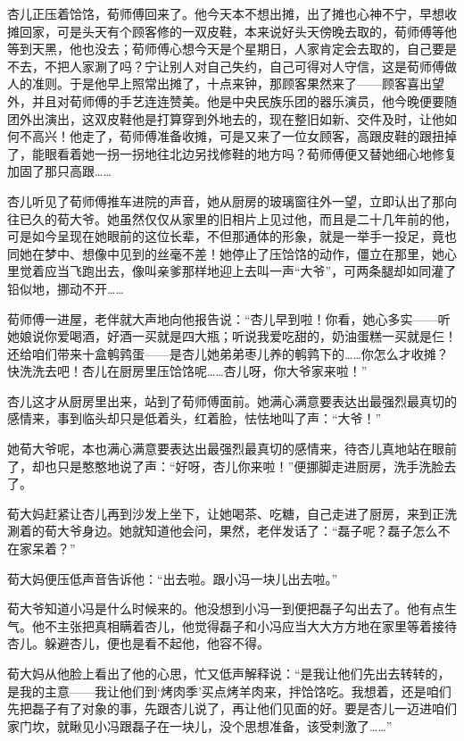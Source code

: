 \par 杏儿正压着饸饹，荀师傅回来了。他今天本不想出摊，出了摊也心神不宁，早想收摊回家，可是头天有个顾客修的一双皮鞋，本来说好头天傍晚去取的，荀师傅等他等到天黑，他也没去；荀师傅心想今天是个星期日，人家肯定会去取的，自己要是不去，不把人家涮了吗？宁让别人对自己失约，自己可得对人守信，这是荀师傅做人的准则。于是他早上照常出摊了，十点来钟，那顾客果然来了——顾客喜出望外，并且对荀师傅的手艺连连赞美。他是中央民族乐团的器乐演员，他今晚便要随团外出演出，这双皮鞋他是打算穿到外地去的，现在整旧如新、交件及时，让他如何不高兴！他走了，荀师傅准备收摊，可是又来了一位女顾客，高跟皮鞋的跟扭掉了，能眼看着她一拐一拐地往北边另找修鞋的地方吗？荀师傅便又替她细心地修复加固了那只高跟……
\par 杏儿听见了荀师傅推车进院的声音，她从厨房的玻璃窗往外一望，立即认出了那向往已久的荀大爷。她虽然仅仅从家里的旧相片上见过他，而且是二十几年前的他，可是如今呈现在她眼前的这位长辈，不但那通体的形象，就是一举手一投足，竟也同她在梦中、想像中见到的丝毫不差！她停止了压饸饹的动作，僵立在那里，她心里觉着应当飞跑出去，像叫亲爹那样地迎上去叫一声“大爷”，可两条腿却如同灌了铅似地，挪动不开……
\par 荀师傅一进屋，老伴就大声地向他报告说：“杏儿早到啦！你看，她心多实——听她娘说你爱喝酒，好酒一买就是四大瓶；听说我爱吃甜的，奶油蛋糕一买就是仨！还给咱们带来十盒鹌鹑蛋——是杏儿她弟弟枣儿养的鹌鹑下的……你怎么才收摊？快洗洗去吧！杏儿在厨房里压饸饹呢……杏儿呀，你大爷家来啦！”
\par 杏儿这才从厨房里出来，站到了荀师傅面前。她满心满意要表达出最强烈最真切的感情来，事到临头却只是低着头，红着脸，怯怯地叫了声：“大爷！”
\par 她荀大爷呢，本也满心满意要表达出最强烈最真切的感情来，待杏儿真地站在眼前了，却也只是憨憨地说了声：“好呀，杏儿你来啦！”便挪脚走进厨房，洗手洗脸去了。
\par 荀大妈赶紧让杏儿再到沙发上坐下，让她喝茶、吃糖，自己走进了厨房，来到正洗涮着的荀大爷身边。她就知道他会问，果然，老伴发话了：“磊子呢？磊子怎么不在家呆着？”
\par 荀大妈便压低声音告诉他：“出去啦。跟小冯一块儿出去啦。”
\par 荀大爷知道小冯是什么时候来的。他没想到小冯一到便把磊子勾出去了。他有点生气。他不主张把真相瞒着杏儿，他觉得磊子和小冯应当大大方方地在家里等着接待杏儿。躲避杏儿，便也是看不起他，他容不得。
\par 荀大妈从他脸上看出了他的心思，忙又低声解释说：“是我让他们先出去转转的，是我的主意——我让他们到‘烤肉季’买点烤羊肉来，拌饸饹吃。我想着，还是咱们先把磊子有了对象的事，先跟杏儿说了，再让他们见面的好。要是杏儿一迈进咱们家门坎，就瞅见小冯跟磊子在一块儿，没个思想准备，该受刺激了……”
